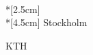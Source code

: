 \thispagestyle{empty}
\vspace*{\fill}
\begin{center}
{\huge\ttitle}\\*[2.5cm]
\Large\sf\thesisauthor\\*[4.5cm]
\small\sf Stockholm \thesisyear
\end{center}
\vspace*{\fill}
\newpage
\thispagestyle{empty}
\vspace*{11cm}
{\sf KTH}\\

